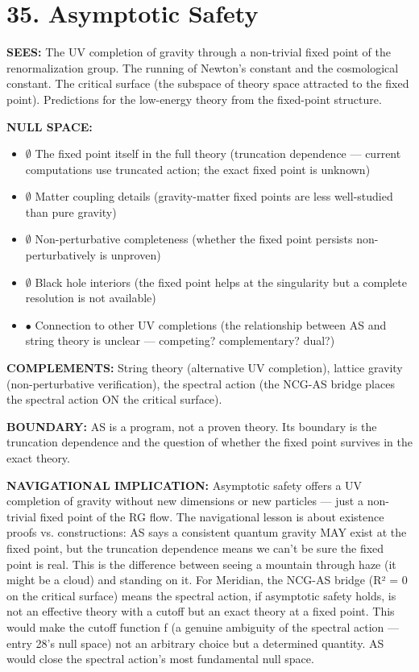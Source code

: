 \bigskip\noindent\makebox[\textwidth]{\color{rulegray}\rule{5cm}{0.3pt}}\bigskip


\section*{35. Asymptotic Safety}


\textbf{SEES:} The UV completion of gravity through a non-trivial fixed point of the renormalization group. The running of Newton's constant and the cosmological constant. The critical surface (the subspace of theory space attracted to the fixed point). Predictions for the low-energy theory from the fixed-point structure.


\textbf{NULL SPACE:}

\begin{itemize}[nosep,leftmargin=*]
  \item $\emptyset$ The fixed point itself in the full theory (truncation dependence — current computations use truncated action; the exact fixed point is unknown)
  \item $\emptyset$ Matter coupling details (gravity-matter fixed points are less well-studied than pure gravity)
  \item $\emptyset$ Non-perturbative completeness (whether the fixed point persists non-perturbatively is unproven)
  \item $\emptyset$ Black hole interiors (the fixed point helps at the singularity but a complete resolution is not available)
  \item $\bullet$ Connection to other UV completions (the relationship between AS and string theory is unclear — competing? complementary? dual?)
\end{itemize}


\textbf{COMPLEMENTS:} String theory (alternative UV completion), lattice gravity (non-perturbative verification), the spectral action (the NCG-AS bridge places the spectral action ON the critical surface).


\textbf{BOUNDARY:} AS is a program, not a proven theory. Its boundary is the truncation dependence and the question of whether the fixed point survives in the exact theory.


\textbf{NAVIGATIONAL IMPLICATION:} Asymptotic safety offers a UV completion of gravity without new dimensions or new particles — just a non-trivial fixed point of the RG flow. The navigational lesson is about existence proofs vs. constructions: AS says a consistent quantum gravity MAY exist at the fixed point, but the truncation dependence means we can't be sure the fixed point is real. This is the difference between seeing a mountain through haze (it might be a cloud) and standing on it. For Meridian, the NCG-AS bridge (R² = 0 on the critical surface) means the spectral action, if asymptotic safety holds, is not an effective theory with a cutoff but an exact theory at a fixed point. This would make the cutoff function f (a genuine ambiguity of the spectral action — entry 28's null space) not an arbitrary choice but a determined quantity. AS would close the spectral action's most fundamental null space.


